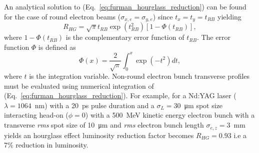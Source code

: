 \documentclass[../main.tex]{subfiles}
\begin{document}
An analytical solution to (Eq.~\ref{eq:furman_hourglass_reduction}) can be found for the case of round electron beams ($\sigma_{x,e}=\sigma_{y,e}$) since $t_{x}=t_{y}=t_{RB}$ yielding
\begin{equation}
R_{HG} = \sqrt{\pi}t_{RB}\exp\left(t_{RB}^{2}\right)\left[1-\Phi\left(t_{RB}\right)\right],
\label{eq:furman_hourglass_reduction_analytical}    
\end{equation}
where $1-\Phi\left(t_{RB}\right)$ is the complementary error function of $t_{RB}$. The error function $\Phi$ is defined as
\begin{equation}
\Phi\left(x\right) = \frac{2}{\sqrt{\pi}}\int_{0}^{x}\exp\left(-t^{2}\right)dt,
\label{eq:error_function}    
\end{equation}
where $t$ is the integration variable. Non-round electron bunch transverse profiles must be evaluated using numerical integration of (Eq.~\ref{eq:furman_hourglass_reduction}). For example, for a Nd:YAG laser ($\lambda = 1064$~\si{\nano\meter}) with a 20~\si{\pico\second} pulse duration and a $\sigma_{L} = 30$~\si{\micro\meter} spot size interacting head-on ($\phi=0$) with a 500~\si{\mega\electronvolt} kinetic energy electron bunch with a transverse \textit{rms} spot size of 10~\si{\micro\meter} and \textit{rms} electron bunch length $\sigma_{e,z} = 3$~\si{\milli\meter} yields an hourglass effect luminosity reduction factor becomes $R_{HG} = 0.93$ i.e a 7\% reduction in luminosity.
\end{document}
